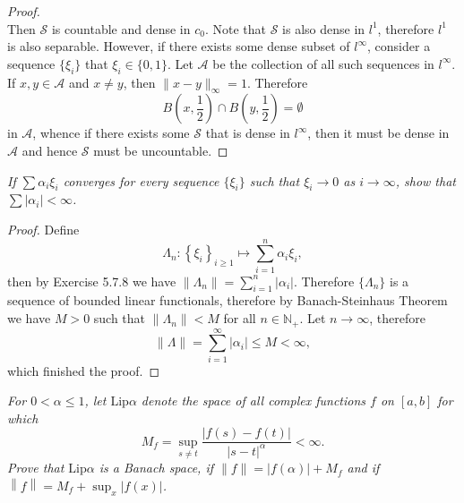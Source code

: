 \begin{proof}
$$$$
Then $\mathcal{S}$ is countable and dense in $c_0$. Note that $\mathcal{S}$ is also dense in $l^1$, therefore $l^1$ is also separable. However, if there exists some dense subset of $l^\infty$, consider a sequence $\{\xi_i\}$ that $\xi_i\in\{0,1\}$. Let $\mathcal{A}$ be the collection of all such sequences in $l^\infty$. If $x,y\in\mathcal{A}$ and $x\ne y$, then $\|x-y\|_\infty=1$. Therefore 
$$
B\left( x,\frac{1}{2} \right) \cap B\left( y,\frac{1}{2} \right) =\emptyset 
$$
in $\mathcal{A}$, whence if there exists some $\mathcal{S}$ that is dense in $l^\infty$, then it must be dense in $\mathcal{A}$ and hence $\mathcal{S}$ must be uncountable.
\end{proof}
\begin{problem}\em
If $\sum\alpha_i\xi_i$ converges for every sequence $\{\xi_i\}$ such that $\xi_i\to 0$ as $i\to\infty$, show that $\sum|\alpha_i|<\infty$.
\end{problem}
\begin{proof}
Define 
$$
\Lambda _n:\left\{ \xi _i \right\} _{i\ge 1}\mapsto \sum_{i=1}^n{\alpha _i\xi _i},
$$
then by Exercise 5.7.8 we have $\|\Lambda_n\|=\sum_{i=1}^n|\alpha_i|$. Therefore $\{\Lambda_n\}$ is a sequence of bounded linear functionals, therefore by Banach-Steinhaus Theorem we have $M>0$ such that $\|\Lambda_n\|<M$ for all $n\in\mathbb{N}_+$. Let $n\to\infty$, therefore 
$$\|\Lambda\|=\sum_{i=1}^\infty|\alpha_i|\le M<\infty,$$
which finished the proof.
\end{proof}
\begin{problem}\em
For $0<\alpha\le 1$, let $\mathrm{Lip}\alpha$ denote the space of all complex functions $f$ on $[a,b]$ for which 
$$
M_f=\mathop {\mathrm{sup}} \limits_{s\ne t}\frac{\left| f\left( s \right) -f\left( t \right) \right|}{\left| s-t \right|^{\alpha}}<\infty .
$$
Prove that $\mathrm{Lip}\alpha$ is a Banach space, if $\|f\|=|f(\alpha)|+M_f$ and if $\left\| f \right\| =M_f+\sup_{x}\left| f\left( x \right) \right|$.
\end{problem}

